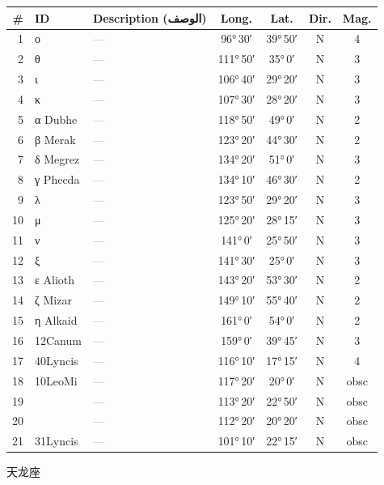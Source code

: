 \documentclass[9pt,a4paper]{extarticle}
\newcommand{\ar}[1]{{\arabicfont\textarabic{#1}}}
\begin{document}
\begin{longtable}{r l >{\raggedright\arraybackslash}p{6.7cm} c c c c}
\toprule \# & ID & Description (\ar{الوصف}) & Long. & Lat. & Dir. & Mag.\\ \midrule\endhead
1 & ο & \textcolor{gray}{—} & 96°\,30′ & 39°\,50′ & N & 4\\
2 & θ & \textcolor{gray}{—} & 111°\,50′ & 35°\,0′ & N & 3\\
3 & ι & \textcolor{gray}{—} & 106°\,40′ & 29°\,20′ & N & 3\\
4 & κ & \textcolor{gray}{—} & 107°\,30′ & 28°\,20′ & N & 3\\
5 & α Dubhe & \textcolor{gray}{—} & 118°\,50′ & 49°\,0′ & N & 2\\
6 & β Merak & \textcolor{gray}{—} & 123°\,20′ & 44°\,30′ & N & 2\\
7 & δ Megrez & \textcolor{gray}{—} & 134°\,20′ & 51°\,0′ & N & 3\\
8 & γ Phecda & \textcolor{gray}{—} & 134°\,10′ & 46°\,30′ & N & 2\\
9 & λ & \textcolor{gray}{—} & 123°\,50′ & 29°\,20′ & N & 3\\
10 & μ & \textcolor{gray}{—} & 125°\,20′ & 28°\,15′ & N & 3\\
11 & ν & \textcolor{gray}{—} & 141°\,0′ & 25°\,50′ & N & 3\\
12 & ξ & \textcolor{gray}{—} & 141°\,30′ & 25°\,0′ & N & 3\\
13 & ε Alioth & \textcolor{gray}{—} & 143°\,20′ & 53°\,30′ & N & 2\\
14 & ζ Mizar & \textcolor{gray}{—} & 149°\,10′ & 55°\,40′ & N & 2\\
15 & η Alkaid & \textcolor{gray}{—} & 161°\,0′ & 54°\,0′ & N & 2\\
16 & 12Canum & \textcolor{gray}{—} & 159°\,0′ & 39°\,45′ & N & 3\\
17 & 40Lyncis & \textcolor{gray}{—} & 116°\,10′ & 17°\,15′ & N & 4\\
18 & 10LeoMi & \textcolor{gray}{—} & 117°\,20′ & 20°\,0′ & N & obsc\\
19 &  & \textcolor{gray}{—} & 113°\,20′ & 22°\,50′ & N & obsc\\
20 &  & \textcolor{gray}{—} & 112°\,20′ & 20°\,20′ & N & obsc\\
21 & 31Lyncis & \textcolor{gray}{—} & 101°\,10′ & 22°\,15′ & N & obsc\\
\bottomrule\end{longtable}
\vspace{4pt}\quad\ar{التنين}\quad 天龙座
\end{document}
